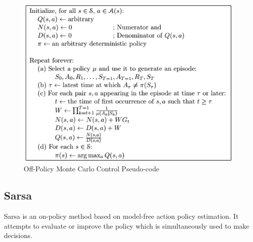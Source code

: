 \documentclass[paper=a4, fontsize=11pt]{scrartcl}
\numberwithin{equation}{section}		%
\numberwithin{figure}{section}			%
\numberwithin{table}{section}				%
\begin{document}
\begin{figure}[H] \centering
\includegraphics[scale=0.8]{offPolicyPseudo.png}
\caption{Off-Policy Monte Carlo Control Pseudo-code} \label{figure:offPolicy}
\end{figure}


\subsection{\textbf {Sarsa}}
Sarsa is an on-policy method based on model-free action policy estimation. It attempts to evaluate or improve the policy which is simultaneously used to make decisions.
\end{document}
